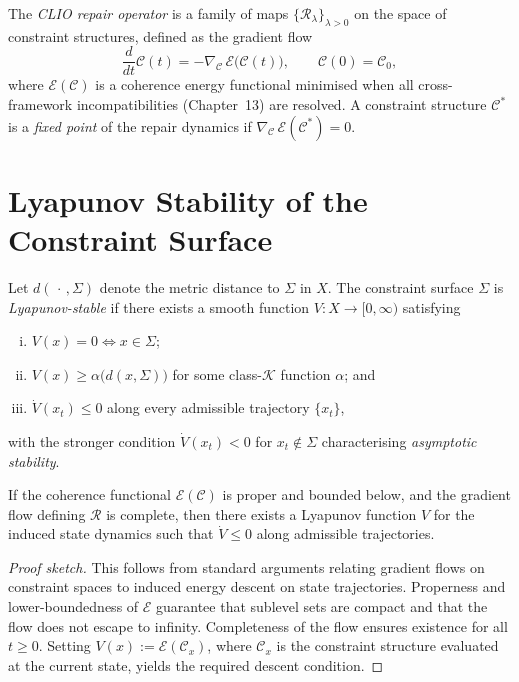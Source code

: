 \documentclass[11pt,openany]{book}
\begin{document}
\begin{definition}
\label{def:clio}
The \emph{CLIO repair operator} is a family of maps
$\{\mathcal{R}_\lambda\}_{\lambda > 0}$ on the space of
constraint structures, defined as the gradient flow
\[
  \frac{d}{dt}\mathcal{C}(t)
    = -\nabla_{\mathcal{C}} \,\mathcal{E}\bigl(\mathcal{C}(t)\bigr),
  \qquad \mathcal{C}(0) = \mathcal{C}_0,
\]
where $\mathcal{E}(\mathcal{C})$ is a coherence energy
functional minimised when all cross-framework
incompatibilities (Chapter~13) are resolved.  A constraint
structure $\mathcal{C}^*$ is a \emph{fixed point} of the
repair dynamics if $\nabla_{\mathcal{C}}\,
\mathcal{E}(\mathcal{C}^*) = 0$.
\end{definition}

\section{Lyapunov Stability of the Constraint Surface}
\label{sec:lyapunov}

\begin{definition}
\label{def:lyapunov-stability}
Let $d(\,\cdot\,,\Sigma)$ denote the metric distance to
$\Sigma$ in $X$.  The constraint surface $\Sigma$ is
\emph{Lyapunov-stable} if there exists a smooth function
$V : X \to [0,\infty)$ satisfying
\begin{enumerate}[(i)]
  \item $V(x) = 0 \iff x \in \Sigma$;
  \item $V(x) \ge \alpha\bigl(d(x,\Sigma)\bigr)$ for some
    class-$\mathcal{K}$ function $\alpha$; and
  \item $\dot{V}(x_t) \le 0$ along every admissible
    trajectory $\{x_t\}$,
\end{enumerate}
with the stronger condition $\dot{V}(x_t) < 0$ for
$x_t \notin \Sigma$ characterising \emph{asymptotic stability}.
\end{definition}

\begin{proposition}
\label{prop:clio-lyapunov}
If the coherence functional $\mathcal{E}(\mathcal{C})$ is
proper and bounded below, and the gradient flow defining
$\mathcal{R}$ is complete, then there exists a Lyapunov
function $V$ for the induced state dynamics such that
$\dot{V} \le 0$ along admissible trajectories.
\end{proposition}

\begin{proof}[Proof sketch]
This follows from standard arguments relating gradient flows
on constraint spaces to induced energy descent on state
trajectories.  Properness and lower-boundedness of
$\mathcal{E}$ guarantee that sublevel sets are compact and
that the flow does not escape to infinity.  Completeness
of the flow ensures existence for all $t \ge 0$.  Setting
$V(x) := \mathcal{E}(\mathcal{C}_x)$, where $\mathcal{C}_x$
is the constraint structure evaluated at the current state,
yields the required descent condition.
\end{proof}
\end{document}
